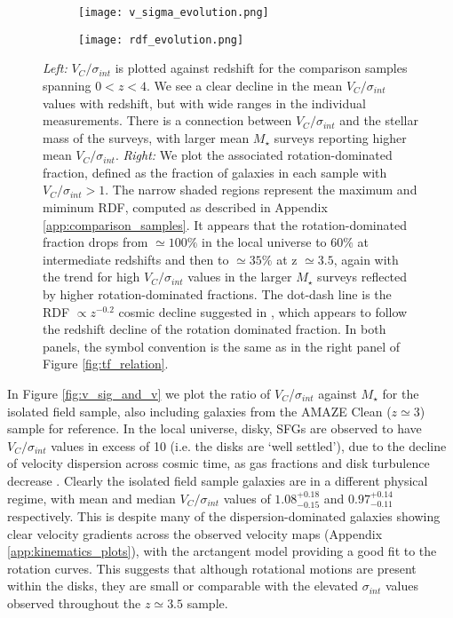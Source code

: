 \documentclass[fleqn,usenatbib]{mnras}
\begin{document}
\begin{figure*}
    \centering \hspace{-1.3cm}
    \begin{subfigure}[h!]{0.5\textwidth}
        \centering
        \texttt{[image: v\_sigma\_evolution.png]}
    \end{subfigure} \hspace{+0.4cm}
    \begin{subfigure}[h!]{0.5\textwidth}
        \centering
        \texttt{[image: rdf\_evolution.png]}
    \end{subfigure}
    \caption{{\it Left:} $V_{C}/\sigma_{int}$ is plotted against redshift for the comparison samples spanning $0 < z < 4$.
    We see a clear decline in the mean $V_{C}/\sigma_{int}$ values with redshift, but with wide ranges in the individual measurements.
    There is a connection between $V_{C}/\sigma_{int}$ and the stellar mass of the surveys, with larger mean $M_{\star}$ surveys reporting higher mean $V_{C}/\sigma_{int}$.
    {\it Right:} We plot the associated rotation-dominated fraction, defined as the fraction of galaxies in each sample with $V_{C}/\sigma_{int} > 1$.
    The narrow shaded regions represent the maximum and miminum RDF, computed as described in Appendix \protect\ref{app:comparison_samples}.
    It appears that the rotation-dominated fraction drops from $\simeq100\%$ in the local universe to $60\%$ at intermediate redshifts and then to $\simeq35\%$ at z $\simeq3.5$, again with the trend for high $V_{C}/\sigma_{int}$ values in the larger $M_{\star}$ surveys reflected by higher rotation-dominated fractions.
    The dot-dash line is the RDF $\propto z^{-0.2}$ cosmic decline suggested in \protect\cite{Stott2016}, which appears to follow the redshift decline of the rotation dominated fraction.
    In both panels, the symbol convention is the same as in the right panel of Figure \protect\ref{fig:tf_relation}.
}
    \label{fig:rdf_and_v_sigma_w_redshift}
\end{figure*}

In Figure \ref{fig:v_sig_and_v} we plot the ratio of $V_{C}$/$\sigma_{int}$ against $M_{\star}$ for the isolated field sample, also including galaxies from the AMAZE Clean ($z\simeq3$) sample for reference.
In the local universe, disky, SFGs are observed to have $V_{C}/\sigma_{int}$ values in excess of 10 (i.e. the disks are `well settled'), due to the decline of velocity dispersion across cosmic time, as gas fractions and disk turbulence decrease \citep[e.g.][]{Epinat2008a,Epinat2008}.
Clearly the isolated field sample galaxies are in a different physical regime, with mean and median $V_{C}/\sigma_{int}$ values of $1.08^{+0.18}_{-0.15}$ and $0.97^{+0.14}_{-0.11}$ respectively.
This is despite many of the dispersion-dominated galaxies showing clear velocity gradients across the observed velocity maps (Appendix \ref{app:kinematics_plots}), with the arctangent model providing a good fit to the rotation curves.
This suggests that although rotational motions are present within the disks, they are small or comparable with the elevated $\sigma_{int}$ values observed throughout the $z\simeq3.5$ sample. \\
\end{document}
